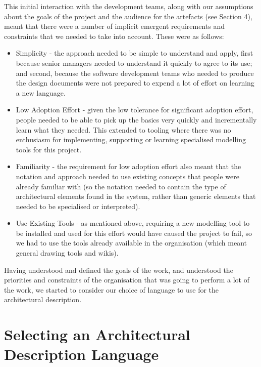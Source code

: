   This initial interaction with the development teams, along with our assumptions about the goals of the project and the audience for the artefacts (see Section 4), meant that there were a number of implicit emergent requirements and constraints that we needed to take into account.  These were as follows:

  \begin{itemize}

\item Simplicity - the approach needed to be simple to understand and apply, first because senior managers needed to understand it quickly to agree to its use; and second, because the software development teams who needed to produce the design documents were not prepared to expend a lot of effort on learning a new language.

\item Low Adoption Effort - given the low tolerance for significant adoption effort, people needed to be able to pick up the basics very quickly and incrementally learn what they needed.  This extended to tooling where there was no enthusiasm for implementing, supporting or learning specialised modelling tools for this project.

\item Familiarity - the requirement for low adoption effort also meant that the notation and approach needed to use existing concepts that people were already familiar with (so the notation needed to contain the type of architectural elements found in the system, rather than generic elements that needed to be specialised or interpreted).

\item Use Existing Tools - as mentioned above, requiring a new modelling tool to be installed and used for this effort would have caused the project to fail, so we had to use the tools already available in the organisation (which meant general drawing tools and wikis).

  \end{itemize}

Having understood and defined the goals of the work, and understood the priorities and constraints of the organisation that was going to perform a lot of the work, we started to consider our choice of language to use for the architectural description.

\section{Selecting an Architectural Description Language}

